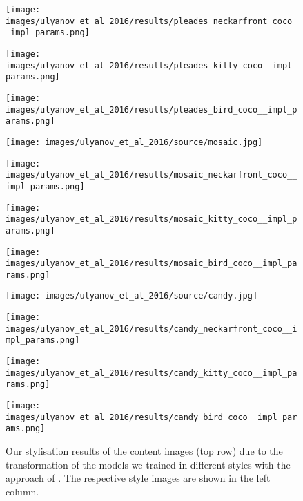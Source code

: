 \begin{figure}[H]
	\hfill%
	\begin{minipage}[t]{0.24\textwidth}
		\centering
		\texttt{[image: images/ulyanov\_et\_al\_2016/results/pleades\_neckarfront\_coco\_\_impl\_params.png]}
	\end{minipage}
	\hfill%
	\begin{minipage}[t]{0.24\textwidth}
		\centering
		\texttt{[image: images/ulyanov\_et\_al\_2016/results/pleades\_kitty\_coco\_\_impl\_params.png]}
	\end{minipage}
	\hfill%
	\begin{minipage}[t]{0.24\textwidth}
		\centering
		\texttt{[image: images/ulyanov\_et\_al\_2016/results/pleades\_bird\_coco\_\_impl\_params.png]}
	\end{minipage}
	\hfill%
	\begin{minipage}[t]{0.24\textwidth}
		\centering
		\texttt{[image: images/ulyanov\_et\_al\_2016/source/mosaic.jpg]}
	\end{minipage}
	\hfill%
	\begin{minipage}[t]{0.24\textwidth}
		\centering
		\texttt{[image: images/ulyanov\_et\_al\_2016/results/mosaic\_neckarfront\_coco\_\_impl\_params.png]}
	\end{minipage}
	\hfill%
	\begin{minipage}[t]{0.24\textwidth}
		\centering
		\texttt{[image: images/ulyanov\_et\_al\_2016/results/mosaic\_kitty\_coco\_\_impl\_params.png]}
	\end{minipage}
	\hfill%
	\begin{minipage}[t]{0.24\textwidth}
		\centering
		\texttt{[image: images/ulyanov\_et\_al\_2016/results/mosaic\_bird\_coco\_\_impl\_params.png]}
	\end{minipage}
	\hfill%
	\begin{minipage}[t]{0.24\textwidth}
		\centering
		\texttt{[image: images/ulyanov\_et\_al\_2016/source/candy.jpg]}
	\end{minipage}
	\hfill%
	\begin{minipage}[t]{0.24\textwidth}
		\centering
		\texttt{[image: images/ulyanov\_et\_al\_2016/results/candy\_neckarfront\_coco\_\_impl\_params.png]}
	\end{minipage}
	\hfill%
	\begin{minipage}[t]{0.24\textwidth}
		\centering
		\texttt{[image: images/ulyanov\_et\_al\_2016/results/candy\_kitty\_coco\_\_impl\_params.png]}
	\end{minipage}
	\hfill%
	\begin{minipage}[t]{0.24\textwidth}
		\centering
		\texttt{[image: images/ulyanov\_et\_al\_2016/results/candy\_bird\_coco\_\_impl\_params.png]}
	\end{minipage}
	\caption{Our stylisation results of the content images (top row) due to the transformation of the models we trained in different styles with the approach of \cite{ULVL2016}. The respective style images are shown in the left column.}
	\label{fig:ulyanov_et_al_2016_impl}
\end{figure}

